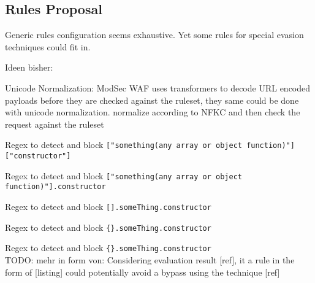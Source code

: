 \subsection{Rules Proposal}
\label{sec:rulesproposal}
Generic rules configuration seems exhaustive. Yet some rules for special evasion techniques could fit in.

{\color{red}Ideen bisher:}

Unicode Normalization: ModSec WAF uses transformers to decode URL encoded payloads before they are checked against the ruleset, they same could be done with unicode normalization. normalize according to NFKC and then check the request against the ruleset 

Regex to detect and block \verb|["something(any array or object function)"]["constructor"]|

Regex to detect and block \verb|["something(any array or object function)"].constructor|

Regex to detect and block \verb|[].someThing.constructor|

Regex to detect and block \verb|{}.someThing.constructor|

Regex to detect and block \verb|{}.someThing.constructor|
\\ 
{\color{red} TODO: mehr in form von: Considering evaluation result [ref], it a rule in the form of [listing] could potentially avoid a bypass using the technique [ref]}
